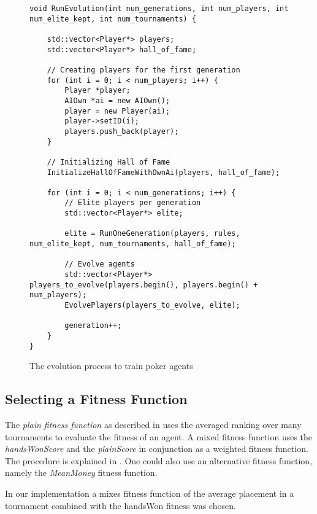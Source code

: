 \begin{figure}
\begin{lstlisting}
void RunEvolution(int num_generations, int num_players, int num_elite_kept, int num_tournaments) {

    std::vector<Player*> players;
    std::vector<Player*> hall_of_fame;

    // Creating players for the first generation
    for (int i = 0; i < num_players; i++) {
        Player *player;
        AIOwn *ai = new AIOwn();
        player = new Player(ai);
        player->setID(i);
        players.push_back(player);
    }

    // Initializing Hall of Fame
    InitializeHallOfFameWithOwnAi(players, hall_of_fame);

    for (int i = 0; i < num_generations; i++) {
        // Elite players per generation
        std::vector<Player*> elite;

        elite = RunOneGeneration(players, rules, num_elite_kept, num_tournaments, hall_of_fame);

        // Evolve agents
        std::vector<Player*> players_to_evolve(players.begin(), players.begin() + num_players);
        EvolvePlayers(players_to_evolve, elite);

        generation++;
    }
}
\end{lstlisting}
\caption{The evolution process to train poker agents}
\label{fig:evol_code}
\end{figure}
\subsection{Selecting a Fitness Function}
The \textit{plain fitness function} as described in  \cite{evolutionary_methods} uses the averaged ranking over many tournaments to evaluate the fitness of an agent. A mixed fitness function uses the \textit{handsWonScore} and the \textit{plainScore} in conjunction as a weighted fitness function. The procedure is explained in \cite[p.65]{evolutionary_methods}. One could also use an alternative fitness function, namely the \textit{MeanMoney} fitness function.\par
In our implementation a mixes fitness function of the average placement in a tournament combined with the handsWon fitness was chosen. 
